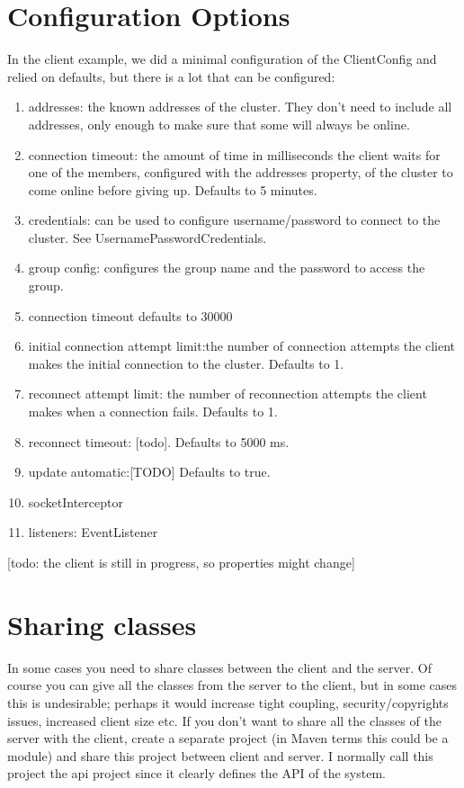 \section{Configuration Options}
In the client example, we did a minimal configuration of the ClientConfig and relied on defaults, but there is a lot that can be configured:
\begin{enumerate}
\item addresses: the known addresses of the cluster. They don't need to include all addresses, only enough to make sure that some will always be online.
\item connection timeout: the amount of time in milliseconds the client waits for one of the members, configured with the addresses property, of the cluster to come online before giving up. Defaults to 5 minutes.
\item credentials: can be used to configure username/password to connect to the cluster. See UsernamePasswordCredentials.
\item group config: configures the group name and the password to access the group.
\item connection timeout defaults to 30000
\item initial connection attempt limit:the  number of connection attempts the client makes the initial connection to the cluster. Defaults to 1.
\item reconnect attempt limit: the number of reconnection attempts the client makes when a connection fails. Defaults to 1.
\item reconnect timeout: [todo]. Defaults to 5000 ms.
\item update automatic:[TODO] Defaults to true.
\item socketInterceptor
\item listeners: EventListener
\end{enumerate}
[todo: the client is still in progress, so properties might change]

\section{Sharing classes}
In some cases you need to share classes between the client and the server. Of course you can give all the classes from the server to the client, but in some cases this is undesirable; perhaps it would increase tight coupling, security/copyrights issues, increased client size etc. If you don't want to share all the classes of the server with the client, create a separate project (in Maven terms this could be a module) and share this project between client and server. I normally call this project the api project since it clearly defines the API of the system. 

